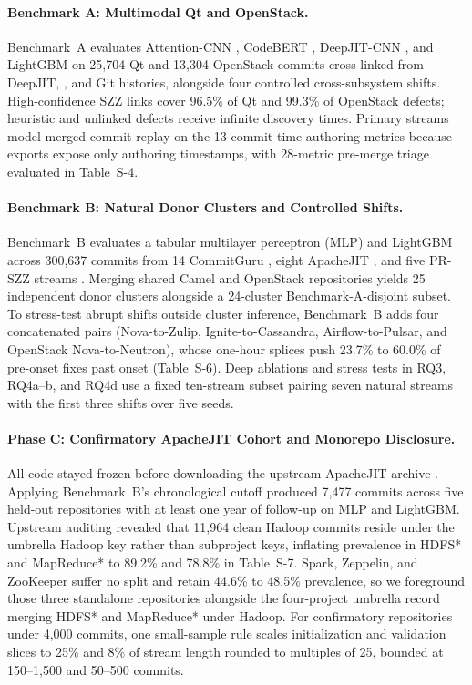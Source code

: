 \documentclass[pdflatex,sn-basic]{sn-jnl}
\theoremstyle{definition}
\theoremstyle{plain}
\begin{document}
\paragraph{Benchmark A: Multimodal Qt and OpenStack.}
Benchmark~A evaluates Attention-CNN \citep{pote2026adaptive}, CodeBERT \citep{feng2020codebert}, DeepJIT-CNN \citep{hoang2019deepjit}, and LightGBM \citep{ke2017lightgbm} on 25,704 Qt and 13,304 OpenStack commits cross-linked from DeepJIT, \citet{mcintosh2018are}, and Git histories, alongside four controlled cross-subsystem shifts. High-confidence SZZ links cover 96.5\% of Qt and 99.3\% of OpenStack defects; heuristic and unlinked defects receive infinite discovery times. Primary streams model merged-commit replay on the 13 commit-time authoring metrics because exports expose only authoring timestamps, with 28-metric pre-merge triage evaluated in Table~S-4.

\paragraph{Benchmark B: Natural Donor Clusters and Controlled Shifts.}
Benchmark~B evaluates a tabular multilayer perceptron (MLP) and LightGBM across 300,637 commits from 14 CommitGuru \citep{cabral2019class}, eight ApacheJIT \citep{keshavarz2022apachejit}, and five PR-SZZ streams \citep{bludau2026quantifying}. Merging shared Camel and OpenStack repositories yields 25 independent donor clusters alongside a 24-cluster Benchmark-A-disjoint subset. To stress-test abrupt shifts outside cluster inference, Benchmark~B adds four concatenated pairs (Nova-to-Zulip, Ignite-to-Cassandra, Airflow-to-Pulsar, and OpenStack Nova-to-Neutron), whose one-hour splices push 23.7\% to 60.0\% of pre-onset fixes past onset (Table~S-6). Deep ablations and stress tests in RQ3, RQ4a--b, and RQ4d use a fixed ten-stream subset pairing seven natural streams with the first three shifts over five seeds.

\paragraph{Phase C: Confirmatory ApacheJIT Cohort and Monorepo Disclosure.}
All code stayed frozen before downloading the upstream ApacheJIT archive \citep{keshavarz2022apachejit}. Applying Benchmark~B's chronological cutoff produced 7,477 commits across five held-out repositories with at least one year of follow-up on MLP and LightGBM. Upstream auditing revealed that 11,964 clean Hadoop commits reside under the umbrella Hadoop key rather than subproject keys, inflating prevalence in HDFS* and MapReduce* to 89.2\% and 78.8\% in Table~S-7. Spark, Zeppelin, and ZooKeeper suffer no split and retain 44.6\% to 48.5\% prevalence, so we foreground those three standalone repositories alongside the four-project umbrella record merging HDFS* and MapReduce* under Hadoop. For confirmatory repositories under 4,000 commits, one small-sample rule scales initialization and validation slices to 25\% and 8\% of stream length rounded to multiples of 25, bounded at 150--1,500 and 50--500 commits.
\end{document}
